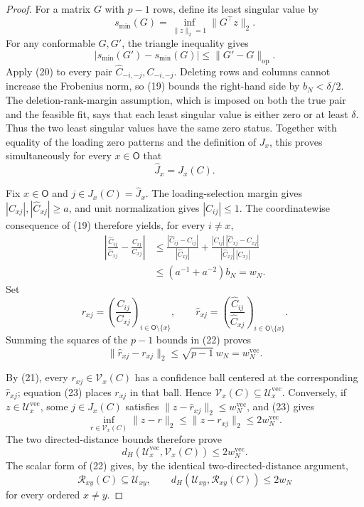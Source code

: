 \documentclass{article}
\begin{document}
\begin{proof}
For a matrix \(G\) with \(p-1\) rows, define its least singular value by
\[
 s_{\min}(G)=\inf_{\lVert z\rVert_2=1}\lVert G^\top z\rVert_2.
\]
For any conformable \(G,G'\), the triangle inequality gives
\[
 |s_{\min}(G')-s_{\min}(G)|
 \le\lVert G'-G\rVert_{\mathrm{op}}.
 \tag{20}
\]
Apply (20) to every pair \(\widehat C_{-i,-j},C_{-i,-j}\). Deleting rows and columns cannot increase the Frobenius norm, so (19) bounds the right-hand side by \(b_N<\delta/2\). The deletion-rank-margin assumption, which is imposed on both the true pair and the feasible fit, says that each least singular value is either zero or at least \(\delta\). Thus the two least singular values have the same zero status. Together with equality of the loading zero patterns and the definition of \(J_x\), this proves simultaneously for every \(x\in\mathsf O\) that
\[
 \widehat J_x=J_x(C).
 \tag{21}
\]

Fix \(x\in\mathsf O\) and \(j\in J_x(C)=\widehat J_x\). The loading-selection margin gives \(|C_{xj}|,|\widehat C_{xj}|\ge a\), and unit normalization gives \(|C_{ij}|\le1\). The coordinatewise consequence of (19) therefore yields, for every \(i\ne x\),
\[
 \begin{aligned}
 \left|\frac{\widehat C_{ij}}{\widehat C_{xj}}
 -\frac{C_{ij}}{C_{xj}}\right|
 &\le
 \frac{|\widehat C_{ij}-C_{ij}|}{|\widehat C_{xj}|}
 +\frac{|C_{ij}|\,|\widehat C_{xj}-C_{xj}|}
 {|\widehat C_{xj}|\,|C_{xj}|}\\
 &\le(a^{-1}+a^{-2})b_N=w_N.
 \end{aligned}
 \tag{22}
\]
Set
\[
 r_{xj}=\left(\frac{C_{ij}}{C_{xj}}\right)_{i\in\mathsf O\setminus\{x\}},
 \qquad
 \widehat r_{xj}=\left(
 \frac{\widehat C_{ij}}{\widehat C_{xj}}
 \right)_{i\in\mathsf O\setminus\{x\}}.
\]
Summing the squares of the \(p-1\) bounds in (22) proves
\[
 \lVert\widehat r_{xj}-r_{xj}\rVert_2
 \le\sqrt{p-1}\,w_N=w_N^{\mathrm{vec}}.
 \tag{23}
\]

By (21), every \(r_{xj}\in\mathcal V_x(C)\) has a confidence ball centered at the corresponding \(\widehat r_{xj}\); equation (23) places \(r_{xj}\) in that ball. Hence \(\mathcal V_x(C)\subseteq\mathcal U_x^{\mathrm{vec}}\). Conversely, if \(z\in\mathcal U_x^{\mathrm{vec}}\), some \(j\in J_x(C)\) satisfies \(\lVert z-\widehat r_{xj}\rVert_2\le w_N^{\mathrm{vec}}\), and (23) gives
\[
 \inf_{r\in\mathcal V_x(C)}\lVert z-r\rVert_2
 \le\lVert z-r_{xj}\rVert_2
 \le2w_N^{\mathrm{vec}}.
\]
The two directed-distance bounds therefore prove
\[
 d_H(\mathcal U_x^{\mathrm{vec}},\mathcal V_x(C))
 \le2w_N^{\mathrm{vec}}.
 \tag{24}
\]
The scalar form of (22) gives, by the identical two-directed-distance argument,
\[
 \mathcal R_{xy}(C)\subseteq\mathcal U_{xy},
 \qquad
 d_H(\mathcal U_{xy},\mathcal R_{xy}(C))\le2w_N
 \tag{25}
\]
for every ordered \(x\ne y\).


\end{proof}
\end{document}
